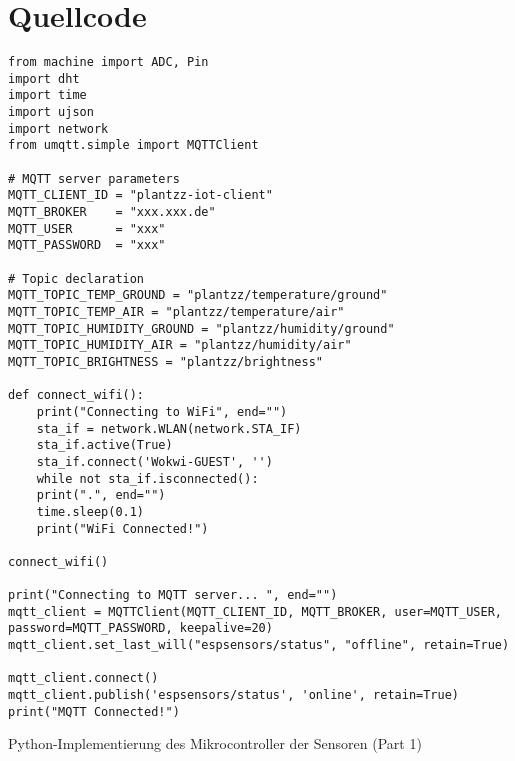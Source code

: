 
\section{Quellcode}

\begin{listing}[!ht]
\begin{verbatim}
from machine import ADC, Pin
import dht
import time
import ujson
import network
from umqtt.simple import MQTTClient 

# MQTT server parameters
MQTT_CLIENT_ID = "plantzz-iot-client"
MQTT_BROKER    = "xxx.xxx.de"
MQTT_USER      = "xxx"
MQTT_PASSWORD  = "xxx"

# Topic declaration
MQTT_TOPIC_TEMP_GROUND = "plantzz/temperature/ground"
MQTT_TOPIC_TEMP_AIR = "plantzz/temperature/air"
MQTT_TOPIC_HUMIDITY_GROUND = "plantzz/humidity/ground"
MQTT_TOPIC_HUMIDITY_AIR = "plantzz/humidity/air"
MQTT_TOPIC_BRIGHTNESS = "plantzz/brightness"

def connect_wifi():
    print("Connecting to WiFi", end="")
    sta_if = network.WLAN(network.STA_IF)
    sta_if.active(True)
    sta_if.connect('Wokwi-GUEST', '')
    while not sta_if.isconnected():
    print(".", end="")
    time.sleep(0.1)
    print("WiFi Connected!")

connect_wifi()

print("Connecting to MQTT server... ", end="")
mqtt_client = MQTTClient(MQTT_CLIENT_ID, MQTT_BROKER, user=MQTT_USER, password=MQTT_PASSWORD, keepalive=20)
mqtt_client.set_last_will("espsensors/status", "offline", retain=True)

mqtt_client.connect()
mqtt_client.publish('espsensors/status', 'online', retain=True)
print("MQTT Connected!")
\end{verbatim}
\caption{Python-Implementierung des Mikrocontroller der Sensoren (Part 1)}
\label{list:wokwi_sensoren1}
\end{listing}

